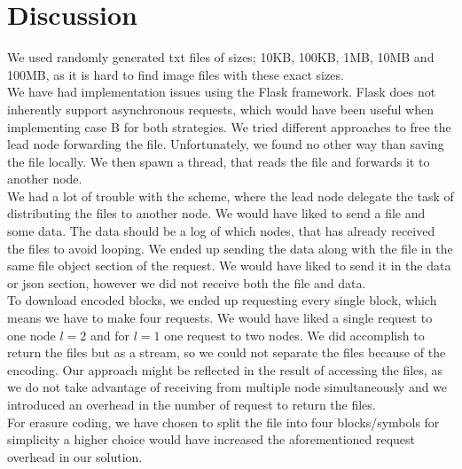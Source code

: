 \section{Discussion} \label{sec:dis}

We used randomly generated txt files of sizes; 10KB, 100KB, 1MB, 10MB and 100MB, as it is hard to find image files with these exact sizes. \\
We have had implementation issues using the Flask framework. 
Flask does not inherently support asynchronous requests, which would have been useful when implementing case B for both strategies. We tried different approaches to free the lead node forwarding the file. Unfortunately, we found no other way than saving the file locally. We then spawn a thread, that reads the file and forwards it to another node.\\
We had a lot of trouble with the scheme, where the lead node delegate the task of distributing the files to another node. We would have liked to send a file and some data. The data should be a log of which nodes, that has already received the files to avoid looping. We ended up sending the data along with the file in the same file object section of the request. We would have liked to send it in the data or json section, however we did not receive both the file and data. \\
To download encoded blocks, we ended up requesting every single block, which means we have to make four requests. We would have liked a single request to one node $l=2$ and for $l=1$ one request to two nodes. We did accomplish to return the files but as a stream, so we could not separate the files because of the encoding. Our approach might be reflected in the result of accessing the files, as we do not take advantage of receiving from multiple node simultaneously and we introduced an overhead in the number of request to return the files.\\
For erasure coding, we have chosen to split the file into four blocks/symbols for simplicity a higher choice would have increased the aforementioned request overhead in our solution. 